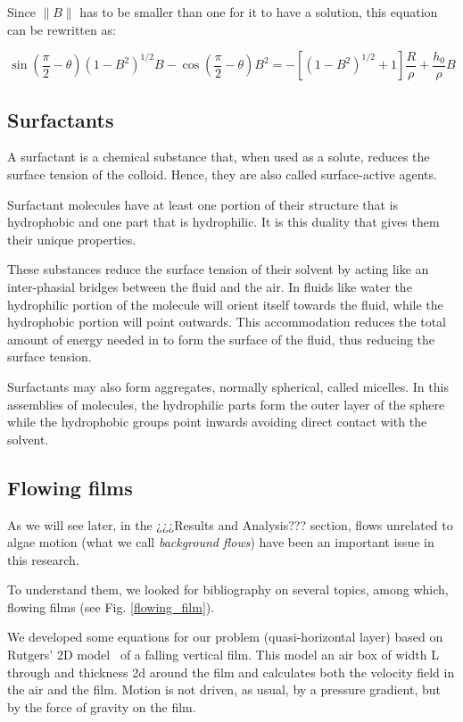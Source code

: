 Since $\|B\|$ has to be smaller than one for it to have a solution, this equation can be rewritten as:

\begin{equation}
\sin \left(\frac{\pi}{2} - \theta \right) (1 - B^2)^{1/2} B - \cos \left(\frac{\pi}{2} - \theta\right) B^2 = - [(1 - B^2)^{1/2}+1] \frac{R}{\rho} + \frac{h_0}{\rho} B
\end{equation}

\subsection{Surfactants}

A surfactant is a chemical substance that, when used as a solute, reduces the surface tension of the colloid. Hence, they are also called surface-active agents.
 
Surfactant molecules have at least one portion of their structure that is hydrophobic and one part that is hydrophilic. It is this duality that gives them their unique properties.
 
These substances reduce the surface tension of their solvent by acting like an inter-phasial bridges between the fluid and the air. In fluids like water the hydrophilic portion of the molecule will orient itself towards the fluid, while the hydrophobic portion will point outwards. This accommodation reduces the total amount of energy needed in to form the surface of the fluid, thus reducing the surface tension.
 
Surfactants may also form aggregates, normally spherical, called micelles. In this assemblies of molecules, the hydrophilic parts form the outer layer of the sphere while the hydrophobic groups point inwards avoiding direct contact with the solvent.

\subsection{Flowing films}

As we will see later, in the ¿¿¿Results and Analysis??? section, flows unrelated to algae motion (what we call \textit{background flows}) have been an important issue in this research.

To understand them, we looked for bibliography on several topics, among which, flowing films (see Fig. \ref{flowing_film}).

We developed some equations for our problem (quasi-horizontal layer) based on Rutgers' 2D model~\cite{Rutgers1998} of a falling vertical film. This model an air box of width L through and thickness 2d around the film and calculates both the velocity field in the air and the film. Motion is not driven, as usual, by a pressure gradient, but by the force of gravity on the film.

